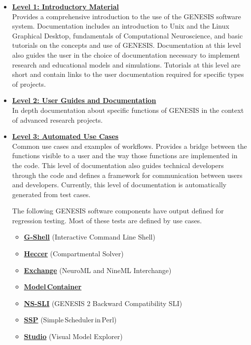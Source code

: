 \documentclass[12pt]{article}
\begin{document}
\begin{itemize}

\item[]\href{../contents-level1/contents-level1.tex}{\bf \underline{Level 1: Introductory Material}}\\
Provides a comprehensive
  introduction to the use of the GENESIS software system.
  Documentation includes an introduction to Unix and the Linux
  Graphical Desktop, fundamentals of Computational Neuroscience, and
  basic tutorials on the concepts and use of GENESIS. Documentation at
  this level also guides the user in the choice of documentation
  necessary to implement research and educational models and
  simulations.  Tutorials at this level are short and contain links to
  the user documentation required for specific types of projects.

\item[]\href{../contents-level2/contents-level2.tex}{\bf \underline{Level 2: User Guides and Documentation}}\\
 In depth
  documentation about specific functions of GENESIS in the context of
  advanced research projects.

\item[]\href{http://www.neurospaces.org/tests-menu.html}{\bf \underline{Level 3: Automated Use Cases}}\\
  Common use cases and examples
  of workflows. Provides a bridge between the functions visible to a user and
  the way those functions are implemented in the code.  This level of documentation also guides technical developers through the code and defines a
  framework for communication between users and developers.
  Currently, this level of documentation is automatically generated
  from test cases.
  
The following GENESIS software components have output defined for regression testing. Most of these tests are defined by use cases.
\begin{itemize}
\item[]\href{../tests-gshell/tests-gshell.tex}{\bf G-Shell} (Interactive Command Line Shell)
\item[]\href{../tests-heccer/tests-heccer.tex}{\bf Heccer} (Compartmental Solver)
\item[]\href{../tests-exchange/tests-exchange.tex}{\bf Exchange} (NeuroML and NineML Interchange)
\item[]\href{../tests-model-container/tests-model-container.tex}{\bf  Model\,Container}
\item[]\href{../tests-g2-backward-compatibility/tests-g2-backward-compatibility.tex}{\bf NS-SLI} (GENESIS 2 Backward Compatibility SLI)
\item[]\href{../tests-ssp/tests-ssp.tex}{\bf SSP} {(Simple\,Scheduler\,in\,Perl)}
\item[]\href{../tests-studio/tests-studio.tex}{\bf Studio} (Visual Model Explorer)
\end{itemize}
  

\end{itemize}
\end{document}
